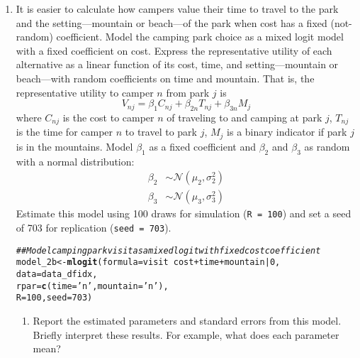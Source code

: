 \documentclass[11pt,letterpaper]{article}\usepackage[]{graphicx}\usepackage[]{color}
\makeatletter
\newcommand{\hlnum}[1]{\textcolor[rgb]{0.686,0.059,0.569}{#1}}%
\newcommand{\hlstr}[1]{\textcolor[rgb]{0.192,0.494,0.8}{#1}}%
\newcommand{\hlcom}[1]{\textcolor[rgb]{0.678,0.584,0.686}{\textit{#1}}}%
\newcommand{\hlopt}[1]{\textcolor[rgb]{0,0,0}{#1}}%
\newcommand{\hlstd}[1]{\textcolor[rgb]{0.345,0.345,0.345}{#1}}%
\newcommand{\hlkwb}[1]{\textcolor[rgb]{0.69,0.353,0.396}{#1}}%
\newcommand{\hlkwc}[1]{\textcolor[rgb]{0.333,0.667,0.333}{#1}}%
\newcommand{\hlkwd}[1]{\textcolor[rgb]{0.737,0.353,0.396}{\textbf{#1}}}%
\newenvironment{kframe}{%
 \def\at@end@of@kframe{}%
 \ifinner\ifhmode%
  \def\at@end@of@kframe{\end{minipage}}%
  \begin{minipage}{\columnwidth}%
 \fi\fi%
 \def\FrameCommand##1{\hskip\@totalleftmargin \hskip-\fboxsep
 \colorbox{shadecolor}{##1}\hskip-\fboxsep
     \hskip-\linewidth \hskip-\@totalleftmargin \hskip\columnwidth}%
 \MakeFramed {\advance\hsize-\width
   \@totalleftmargin\z@ \linewidth\hsize
   \@setminipage}}%
 {\par\unskip\endMakeFramed%
 \at@end@of@kframe}
\newenvironment{knitrout}{}{} %
\makeatother
\begin{document}
\begin{enumerate}[label=\alph*., leftmargin=*]
	\item It is easier to calculate how campers value their time to travel to the park and the setting---mountain or beach---of the park when cost has a fixed (not-random) coefficient. Model the camping park choice as a mixed logit model with a fixed coefficient on cost. Express the representative utility of each alternative as a linear function of its cost, time, and setting---mountain or beach---with random coefficients on time and mountain. That is, the representative utility to camper $n$ from park $j$ is
	$$V_{nj} = \beta_1 C_{nj} + \beta_{2n} T_{nj} + \beta_{3n} M_j$$
	where $C_{nj}$ is the cost to camper $n$ of traveling to and camping at park $j$, $T_{nj}$ is the time for camper $n$ to travel to park $j$, $M_j$ is a binary indicator if park $j$ is in the mountains. Model $\beta_1$ as a fixed coefficient and $\beta_2$ and $\beta_3$ as random with a normal distribution:
	\begin{align*}
		\beta_2 & \sim \mathcal{N}(\mu_2, \sigma_2^2) \\
		\beta_3 & \sim \mathcal{N}(\mu_3, \sigma_3^2)
	\end{align*}
	Estimate this model using 100 draws for simulation (\texttt{R = 100}) and set a seed of 703 for replication (\texttt{seed = 703}).

\begin{knitrout}
\color{fgcolor}\begin{kframe}
\begin{alltt}
\hlcom{## Model camping park visit as a mixed logit with fixed cost coefficient}
\hlstd{model_2b} \hlkwb{<-} \hlkwd{mlogit}\hlstd{(}\hlkwc{formula} \hlstd{= visit} \hlopt{~} \hlstd{cost} \hlopt{+} \hlstd{time} \hlopt{+} \hlstd{mountain} \hlopt{|} \hlnum{0}\hlstd{,}
                   \hlkwc{data} \hlstd{= data_dfidx,}
                   \hlkwc{rpar} \hlstd{=} \hlkwd{c}\hlstd{(}\hlkwc{time} \hlstd{=} \hlstr{'n'}\hlstd{,} \hlkwc{mountain} \hlstd{=} \hlstr{'n'}\hlstd{),}
                   \hlkwc{R} \hlstd{=} \hlnum{100}\hlstd{,} \hlkwc{seed} \hlstd{=} \hlnum{703}\hlstd{)}
\end{alltt}
\end{kframe}
\end{knitrout}

	\begin{enumerate}[label=\roman*.]
		\item Report the estimated parameters and standard errors from this model. Briefly interpret these results. For example, what does each parameter mean?


\end{enumerate}
\end{enumerate}
\end{document}
